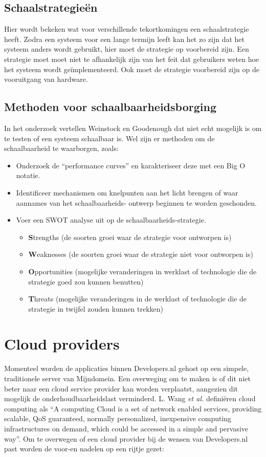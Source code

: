 \subsection{Schaalstrategieën}
Hier wordt bekeken wat voor verschillende tekortkomingen een schaalstrategie heeft. Zodra een systeem voor een lange termijn leeft kan het zo zijn dat het systeem anders wordt gebruikt, hier moet de strategie op voorbereid zijn. Een strategie moet moet niet te afhankelijk zijn van het feit dat gebruikers weten hoe het systeem wordt geïmplementeerd. Ook moet de strategie voorbereid zijn op de vooruitgang van hardware.

\subsection{Methoden voor schaalbaarheidsborging}
In het onderzoek vertellen Weinstock en Goodenough dat niet echt mogelijk is om te testen of een systeem schaalbaar is. Wel zijn er methoden om de schaalbaarheid te waarborgen, zoals:
\begin{itemize}
	\item Onderzoek de \enquote{performance curves} en karakteriseer deze met een Big O notatie.
	\item Identificeer mechanismen om knelpunten aan het licht brengen of waar aannames van het schaalbaarheids- ontwerp beginnen te worden geschonden.
	\item Voer een SWOT analyse uit op de schaalbaarheids-strategie.
	\begin{itemize}
		\item \textbf{S}trengths (de soorten groei waar de strategie voor ontworpen is)
		\item \textbf{W}eaknesses (de soorten groei waar de strategie niet voor ontworpen is)
		\item \textbf{O}pportunities (mogelijke veranderingen in werklast of technologie die de strategie goed zou kunnen benutten)
		\item \textbf{T}hreats (mogelijke veranderingen in de werklast of technologie die de strategie in twijfel zouden kunnen trekken)
	\end{itemize}
\end{itemize}

\section{Cloud providers}

Momenteel worden de applicaties binnen Developers.nl gehost op een simpele, traditionele server van Mijndomein. Een overweging om te maken is of dit niet beter naar een cloud service provider kan worden verplaatst, aangezien dit mogelijk de onderhoudbaarheidslast verminderd. L. Wang \textit{et al.} \parencite{CloudPerspective} definiëren cloud computing als \enquote{A computing Cloud is a set of network enabled services, providing scalable, QoS guaranteed, normally personalized, inexpensive computing infrastructures on demand, which could be accessed in a simple and pervasive way}. Om te overwegen of een cloud provider bij de wensen van Developers.nl past worden de voor-en nadelen op een rijtje gezet:


